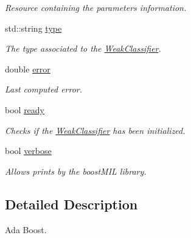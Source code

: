 \begin{DoxyCompactItemize}
\begin{DoxyCompactList}\small\item\em Resource containing the parameters information. \end{DoxyCompactList}\item 
std\+::string \hyperlink{classiCub_1_1boostMIL_1_1WeakClassifier_a6e08c26ea2e12086317d6cdd0f65bbd9}{type}\label{classiCub_1_1boostMIL_1_1WeakClassifier_a6e08c26ea2e12086317d6cdd0f65bbd9}

\begin{DoxyCompactList}\small\item\em The type associated to the \hyperlink{classiCub_1_1boostMIL_1_1WeakClassifier}{Weak\+Classifier}. \end{DoxyCompactList}\item 
double \hyperlink{classiCub_1_1boostMIL_1_1WeakClassifier_afa9e7bb9b9a92d349b40a4f127386a59}{error}\label{classiCub_1_1boostMIL_1_1WeakClassifier_afa9e7bb9b9a92d349b40a4f127386a59}

\begin{DoxyCompactList}\small\item\em Last computed error. \end{DoxyCompactList}\item 
bool \hyperlink{classiCub_1_1boostMIL_1_1WeakClassifier_a7fe5fe3366a82def4031c16a9a278350}{ready}\label{classiCub_1_1boostMIL_1_1WeakClassifier_a7fe5fe3366a82def4031c16a9a278350}

\begin{DoxyCompactList}\small\item\em Checks if the \hyperlink{classiCub_1_1boostMIL_1_1WeakClassifier}{Weak\+Classifier} has been initialized. \end{DoxyCompactList}\item 
bool \hyperlink{classiCub_1_1boostMIL_1_1WeakClassifier_a63a5602437f6936da17e33ca4d89976a}{verbose}\label{classiCub_1_1boostMIL_1_1WeakClassifier_a63a5602437f6936da17e33ca4d89976a}

\begin{DoxyCompactList}\small\item\em Allows prints by the boost\+M\+I\+L library. \end{DoxyCompactList}\end{DoxyCompactItemize}


\subsection{Detailed Description}
Ada Boost. 


